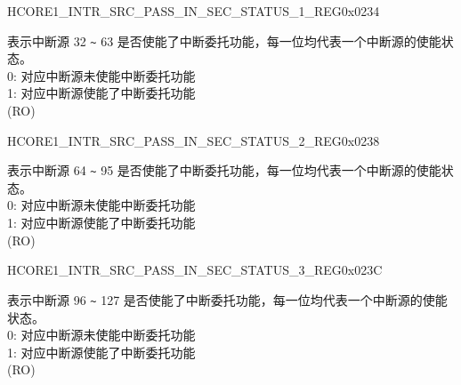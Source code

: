 \begin{register}{H}{CORE1\_INTR\_SRC\_PASS\_IN\_SEC\_STATUS\_1\_REG}{0x0234}\label{regdesc:CORE1INTRSRCPASSINSECSTATUS1REG}
%
\regnewline%
\begin{regdesc}\begin{reglist}
\label{fielddesc:CORE1INTRSRCPASSINSECSTATUS1}\item [CORE1\_INTR\_SRC\_PASS\_IN\_SEC\_STATUS\_1] 表示中断源 32 \verb+~+ 63 是否使能了中断委托功能，每一位均代表一个中断源的使能状态。\\
0: 对应中断源未使能中断委托功能\\
1: 对应中断源使能了中断委托功能\\
(RO)
\end{reglist}\end{regdesc}
\end{register}

\begin{register}{H}{CORE1\_INTR\_SRC\_PASS\_IN\_SEC\_STATUS\_2\_REG}{0x0238}\label{regdesc:CORE1INTRSRCPASSINSECSTATUS2REG}
%
\regnewline%
\begin{regdesc}\begin{reglist}
\label{fielddesc:CORE1INTRSRCPASSINSECSTATUS2}\item [CORE1\_INTR\_SRC\_PASS\_IN\_SEC\_STATUS\_2] 表示中断源 64 \verb+~+ 95 是否使能了中断委托功能，每一位均代表一个中断源的使能状态。\\
0: 对应中断源未使能中断委托功能\\
1: 对应中断源使能了中断委托功能\\
(RO)
\end{reglist}\end{regdesc}
\end{register}

\begin{register}{H}{CORE1\_INTR\_SRC\_PASS\_IN\_SEC\_STATUS\_3\_REG}{0x023C}\label{regdesc:CORE1INTRSRCPASSINSECSTATUS3REG}
%
\regnewline%
\begin{regdesc}\begin{reglist}
\label{fielddesc:CORE1INTRSRCPASSINSECSTATUS3}\item [CORE1\_INTR\_SRC\_PASS\_IN\_SEC\_STATUS\_3] 表示中断源 96 \verb+~+ 127 是否使能了中断委托功能，每一位均代表一个中断源的使能状态。\\
0: 对应中断源未使能中断委托功能\\
1: 对应中断源使能了中断委托功能\\
(RO)
\end{reglist}\end{regdesc}
\end{register}

